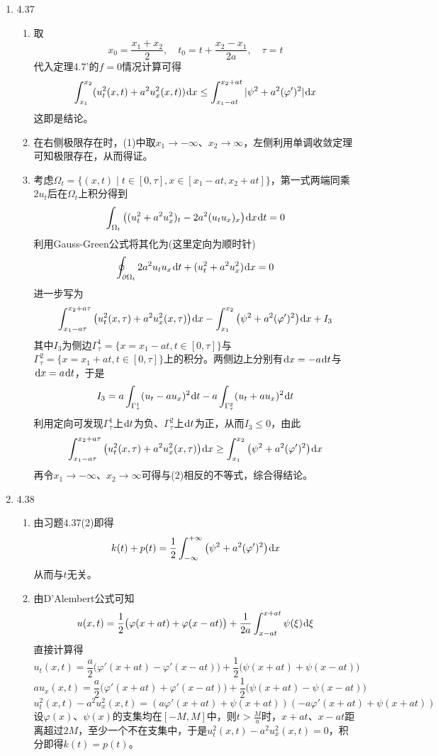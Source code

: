 \documentclass[a4paper,UTF8,fontset=windows,10pt]{ctexart}
\newcommand*{\dr}{\hspace{0.07em}\mathrm{d}}
\begin{document}
\begin{enumerate}
    \item 4.37
    \begin{enumerate}[(1)]
        \item 取
        $$x_0=\frac{x_1+x_2}{2},\quad t_0=t+\frac{x_2-x_1}{2a},\quad\tau=t$$
        代入定理4.7'的$f=0$情况计算可得
        $$\int_{x_1}^{x_2}(u_t^2(x,t)+a^2u_x^2(x,t))\dr x\le\int_{x_1-at}^{x_2+at}|\psi^2+a^2(\varphi')^2|\dr x$$
        这即是结论。
    
        \item
        在右侧极限存在时，(1)中取$x_1\to-\infty$、$x_2\to\infty$，左侧利用单调收敛定理可知极限存在，从而得证。
    
        \item 考虑$\Omega_t=\{(x,t)\mid t\in[0,\tau],x\in[x_1-at,x_2+at]\}$，第一式两端同乘$2u_t$后在$\Omega_t$上积分得到
        $$\int_{\Omega_t}\big((u_t^2+a^2u_x^2)_t-2a^2(u_tu_x)_x\big)\dr x\dr t=0$$
        利用Gauss-Green公式将其化为(这里定向为顺时针)
        $$\oint_{\partial\Omega_t}2a^2u_tu_x\dr t+(u_t^2+a^2u_x^2)\dr x=0$$
        进一步写为
        $$\int_{x_1-a\tau}^{x_2+a\tau}\big(u_t^2(x,\tau)+a^2u_x^2(x,\tau)\big)\dr x-\int_{x_1}^{x_2}\big(\psi^2+a^2(\varphi')^2\big)\dr x+I_3$$
        其中$I_3$为侧边$\Gamma_\tau^1=\{x=x_1-at,t\in[0,\tau]\}$与$\Gamma_\tau^2=\{x=x_1+at,t\in[0,\tau]\}$上的积分。两侧边上分别有$\dr x=-a\dr t$与$\dr x=a\dr t$，于是
        $$I_3=a\int_{\Gamma_\tau^1}(u_t-au_x)^2\dr t-a\int_{\Gamma_\tau^2}(u_t+au_x)^2\dr t$$
        利用定向可发现$\Gamma_\tau^1$上$\dr t$为负、$\Gamma_\tau^2$上$\dr t$为正，从而$I_3\le0$，由此
        $$\int_{x_1-a\tau}^{x_2+a\tau}\big(u_t^2(x,\tau)+a^2u_x^2(x,\tau)\big)\dr x\ge\int_{x_1}^{x_2}\big(\psi^2+a^2(\varphi')^2\big)\dr x$$
        再令$x_1\to-\infty$、$x_2\to\infty$可得与(2)相反的不等式，综合得结论。
    \end{enumerate}
    
    \item 4.38
    \begin{enumerate}[(1)]
        \item 由习题4.37(2)即得
        $$k(t)+p(t)=\frac{1}{2}\int_{-\infty}^{+\infty}\big(\psi^2+a^2(\varphi')^2\big)\dr x$$
        从而与$t$无关。
    
        \item 由D'Alembert公式可知
        $$u(x,t)=\frac{1}{2}\big(\varphi(x+at)+\varphi(x-at)\big)+\frac{1}{2a}\int_{x-at}^{x+at}\psi(\xi)\dr\xi$$
        直接计算得
        $$u_t(x,t)=\frac{a}{2}\big(\varphi'(x+at)-\varphi'(x-at)\big)+\frac{1}{2}\big(\psi(x+at)+\psi(x-at)\big)$$
        $$au_x(x,t)=\frac{a}{2}\big(\varphi'(x+at)+\varphi'(x-at)\big)+\frac{1}{2}\big(\psi(x+at)-\psi(x-at)\big)$$
        $$u_t^2(x,t)-a^2u_x^2(x,t)=(a\varphi'(x+at)+\psi(x+at))(-a\varphi'(x+at)+\psi(x+at))$$
        设$\varphi(x)$、$\psi(x)$的支集均在$[-M,M]$中，则$t>\frac{M}{a}$时，$x+at$、$x-at$距离超过$2M$，至少一个不在支集中，于是$u_t^2(x,t)-a^2u_x^2(x,t)=0$，积分即得$k(t)=p(t)$。
    \end{enumerate}
\end{enumerate}
\end{document}
